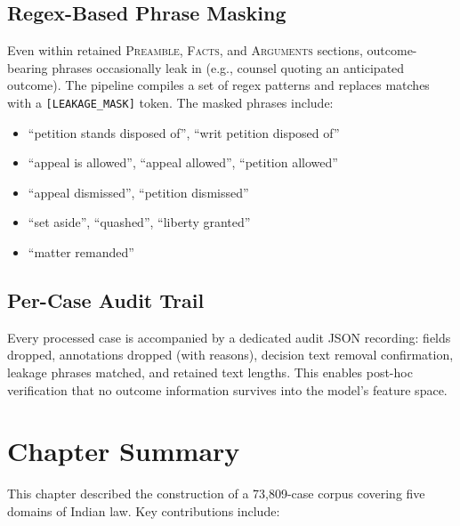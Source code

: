 \subsection{Regex-Based Phrase Masking}

Even within retained \textsc{Preamble}, \textsc{Facts}, and \textsc{Arguments} sections, outcome-bearing phrases occasionally leak in (e.g., counsel quoting an anticipated outcome). The pipeline compiles a set of regex patterns and replaces matches with a \texttt{[LEAKAGE\_MASK]} token. The masked phrases include:

\begin{itemize}
    \item ``petition stands disposed of'', ``writ petition disposed of''
    \item ``appeal is allowed'', ``appeal allowed'', ``petition allowed''
    \item ``appeal dismissed'', ``petition dismissed''
    \item ``set aside'', ``quashed'', ``liberty granted''
    \item ``matter remanded''
\end{itemize}

\subsection{Per-Case Audit Trail}

Every processed case is accompanied by a dedicated audit JSON recording: fields dropped, annotations dropped (with reasons), decision text removal confirmation, leakage phrases matched, and retained text lengths. This enables post-hoc verification that no outcome information survives into the model's feature space.

\section{Chapter Summary}
\label{sec:ch4-summary}

This chapter described the construction of a 73,809-case corpus covering five domains of Indian law. Key contributions include:

